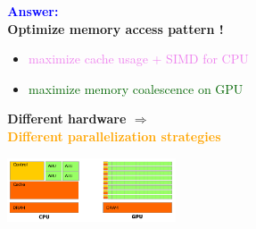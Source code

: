 \begin{frame}[fragile=singleslide]
\begin{columns}
\begin{column}{0.45\textwidth}
\begin{center}
      \end{center}
    \end{column}
    \begin{column}{0.49\textwidth}
\begin{block}{}
  \textcolor{blue}{\bf Answer:}\\
  {\bf Optimize memory access pattern !}
\end{block}
{
  \scriptsize
  \begin{itemize}
  \item \textcolor{violet}{maximize cache usage + SIMD for CPU}
  \item \textcolor{darkgreen}{maximize memory coalescence on GPU}
  \end{itemize}
}
\begin{center}
  \begin{block}{}
    {\bf Different hardware $\Rightarrow$}\\
    \textcolor{orange}{\bf Different parallelization strategies}
  \end{block}

  \includegraphics[width=5cm]{images/perf_portability/cpu_gpu_comparison}
\end{center}
\end{column}
    \hfill
  \end{columns}
\end{frame}


